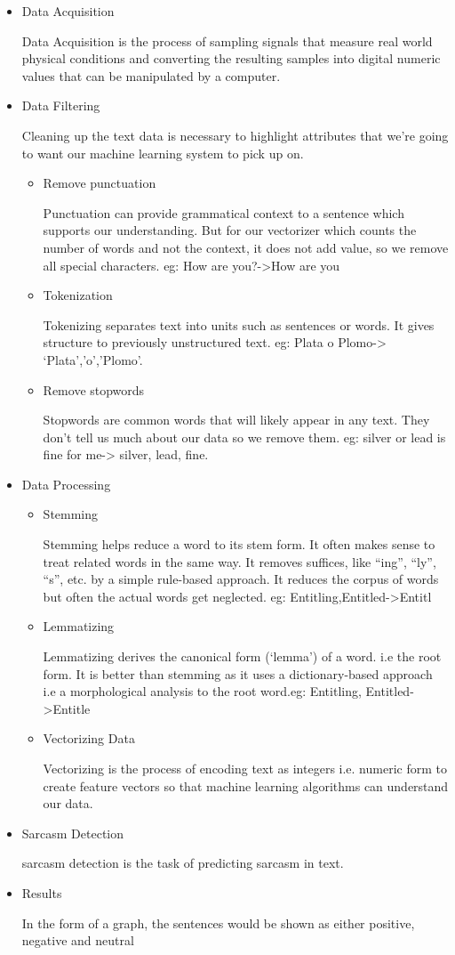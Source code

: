 \documentclass[oneside,a4paper,12pt]{book}
\begin{document}
\begin{itemize}
    \item Data Acquisition
    \par Data Acquisition is the process of sampling signals that measure real world physical conditions and converting the resulting samples into digital numeric values that can be manipulated by a computer.
    \item Data Filtering
    \par Cleaning up the text data is necessary to highlight attributes that we’re going to want our machine learning system to pick up on.
     \begin{itemize}
        \item Remove punctuation
        \par Punctuation can provide grammatical context to a sentence which supports our understanding. But for our vectorizer which counts the number of words and not the context, it does not add value, so we remove all special characters. eg: How are you?->How are you
        \item Tokenization
        \par Tokenizing separates text into units such as sentences or words. It gives structure to previously unstructured text. eg: Plata o Plomo-> ‘Plata’,’o’,’Plomo’.
        \item Remove stopwords
        \par Stopwords are common words that will likely appear in any text. They don’t tell us much about our data so we remove them. eg: silver or lead is fine for me-> silver, lead, fine.
    \end{itemize}
    \item Data Processing
    \begin{itemize}
        \item Stemming
        \par Stemming helps reduce a word to its stem form. It often makes sense to treat related words in the same way. It removes suffices, like “ing”, “ly”, “s”, etc. by a simple rule-based approach. It reduces the corpus of words but often the actual words get neglected. eg: Entitling,Entitled->Entitl
        \item Lemmatizing
        \par Lemmatizing derives the canonical form (‘lemma’) of a word. i.e the root form. It is better than stemming as it uses a dictionary-based approach i.e a morphological analysis to the root word.eg: Entitling, Entitled->Entitle
        \item Vectorizing Data
        \par Vectorizing is the process of encoding text as integers i.e. numeric form to create feature vectors so that machine learning algorithms can understand our data.
    \end{itemize}
    \item Sarcasm Detection
    \par sarcasm detection is the task of predicting sarcasm in text. 
    \item Results
    \par In the form of a graph, the sentences would be shown as either positive, negative and neutral
\end{itemize}
\newpage
\end{document}
